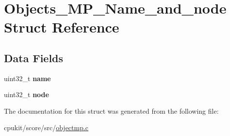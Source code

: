 \hypertarget{structObjects__MP__Name__and__node}{}\section{Objects\+\_\+\+M\+P\+\_\+\+Name\+\_\+and\+\_\+node Struct Reference}
\label{structObjects__MP__Name__and__node}
\subsection*{Data Fields}
\begin{DoxyCompactItemize}
\item 
\mbox{\label{structObjects__MP__Name__and__node_aab49ddb8cb5f2175b6fe9518480ea4fe}} 
uint32\+\_\+t {\bfseries name}
\item 
\mbox{\label{structObjects__MP__Name__and__node_a00558db5dca6052d21223f93e0ba99a5}} 
uint32\+\_\+t {\bfseries node}
\end{DoxyCompactItemize}


The documentation for this struct was generated from the following file\+:\begin{DoxyCompactItemize}
\item 
cpukit/score/src/\mbox{\hyperlink{objectmp_8c}{objectmp.\+c}}\end{DoxyCompactItemize}
